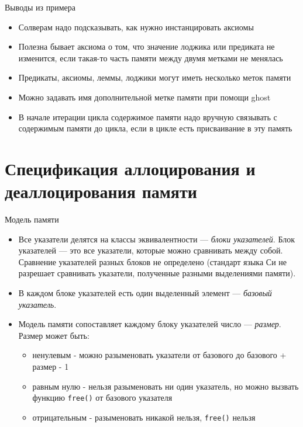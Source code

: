 \documentclass[hyperref={unicode=true}]{beamer}
\begin{document}
    \begin{frame}{Выводы из примера}
    \begin{itemize}
    \item Солверам надо подсказывать, как нужно инстанцировать аксиомы
    \item Полезна бывает аксиома о том, что значение лоджика или предиката не
    изменится, если такая-то часть памяти между двумя метками не менялась
    \item Предикаты, аксиомы, леммы, лоджики могут иметь несколько меток памяти
    \item Можно задавать имя дополнительной метке памяти при помощи ghost
    \item В начале итерации цикла содержимое памяти надо вручную связывать с
    содержимым памяти до цикла, если в цикле есть присваивание в эту память
    \end{itemize}
    \end{frame}

    \section{Спецификация аллоцирования и деаллоцирования памяти}
    \begin{frame}{Модель памяти}
    \begin{itemize}
    \item Все указатели делятся на классы эквивалентности ---
    \emph{блоки указателей}. Блок указателей --- это все указатели, которые
    можно сравнивать между собой.
    Сравнение указателей разных блоков не определено (стандарт языка Си не
    разрешает сравнивать указатели, полученные разными выделениями памяти).

    \item В каждом блоке указателей есть один выделенный элемент ---
    \emph{базовый указатель}.

    \item Модель памяти сопоставляет каждому блоку указателей число ---
    \emph{размер}. Размер может быть:
    \begin{itemize}
    \item ненулевым - можно разыменовать указатели от базового до базового +
    размер - 1
    \item равным нулю - нельзя разыменовать ни один указатель, но можно вызвать
    функцию \texttt{free()} от базового указателя
    \item отрицательным - разыменовать никакой нельзя, \texttt{free()} нельзя
    \end{itemize}
    \end{itemize}
    \end{frame}
\end{document}
